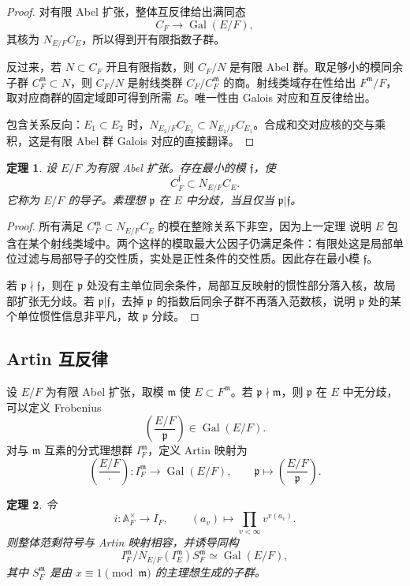 \documentclass[11pt,a4paper,openany]{ctexbook}
\numberwithin{equation}{chapter}
\newcommand{\A}{\mathbb{A}}
\newcommand{\Gal}{\operatorname{Gal}}
\theoremstyle{plain}
\newtheorem{theorem}{定理}[chapter]
\theoremstyle{definition}
\theoremstyle{remark}
\begin{document}
\begin{proof}
对有限 Abel 扩张，整体互反律给出满同态
\[
C_F\to\Gal(E/F),
\]
其核为 $N_{E/F}C_E$，所以得到开有限指数子群。

反过来，若 $N\subset C_F$ 开且有限指数，则 $C_F/N$ 是有限 Abel 群。取足够小的模同余子群 $C_F^{\mathfrak m}\subset N$，则 $C_F/N$ 是射线类群 $C_F/C_F^{\mathfrak m}$ 的商。射线类域存在性给出 $F^{\mathfrak m}/F$，取对应商群的固定域即可得到所需 $E$。唯一性由 Galois 对应和互反律给出。

包含关系反向：$E_1\subset E_2$ 时，$N_{E_2/F}C_{E_2}\subset N_{E_1/F}C_{E_1}$。合成和交对应核的交与乘积，这是有限 Abel 群 Galois 对应的直接翻译。
\end{proof}

\begin{theorem}
设 $E/F$ 为有限 Abel 扩张。存在最小的模 $\mathfrak f$，使
\[
C_F^{\mathfrak f}\subset N_{E/F}C_E.
\]
它称为 $E/F$ 的导子。素理想 $\mathfrak p$ 在 $E$ 中分歧，当且仅当 $\mathfrak p|\mathfrak f$。
\end{theorem}

\begin{proof}
所有满足 $C_F^{\mathfrak m}\subset N_{E/F}C_E$ 的模在整除关系下非空，因为上一定理 说明 $E$ 包含在某个射线类域中。两个这样的模取最大公因子仍满足条件：有限处这是局部单位过滤与局部导子的交性质，实处是正性条件的交性质。因此存在最小模 $\mathfrak f$。

若 $\mathfrak p\nmid\mathfrak f$，则在 $\mathfrak p$ 处没有主单位同余条件，局部互反映射的惯性部分落入核，故局部扩张无分歧。若 $\mathfrak p|\mathfrak f$，去掉 $\mathfrak p$ 的指数后同余子群不再落入范数核，说明 $\mathfrak p$ 处的某个单位惯性信息非平凡，故 $\mathfrak p$ 分歧。
\end{proof}

\subsection{Artin 互反律}

设 $E/F$ 为有限 Abel 扩张，取模 $\mathfrak m$ 使 $E\subset F^{\mathfrak m}$。若 $\mathfrak p\nmid\mathfrak m$，则 $\mathfrak p$ 在 $E$ 中无分歧，可以定义 Frobenius
\[
\left(\frac{E/F}{\mathfrak p}\right)\in\Gal(E/F).
\]
对与 $\mathfrak m$ 互素的分式理想群 $I_F^{\mathfrak m}$，定义 Artin 映射为
\[
\left(\frac{E/F}{\cdot}\right):I_F^{\mathfrak m}\to\Gal(E/F),
\qquad
\mathfrak p\mapsto\left(\frac{E/F}{\mathfrak p}\right).
\]

\begin{theorem}
令
\[
i:\A_F^\times\to I_F,\qquad (a_v)\mapsto\prod_{v<\infty}v^{v(a_v)}.
\]
则整体范剩符号与 Artin 映射相容，并诱导同构
\[
I_F^{\mathfrak m}/N_{E/F}(I_E^{\mathfrak m})S_F^{\mathfrak m}\simeq \Gal(E/F),
\]
其中 $S_F^{\mathfrak m}$ 是由 $x\equiv1\pmod{\mathfrak m}$ 的主理想生成的子群。
\end{theorem}
\end{document}
